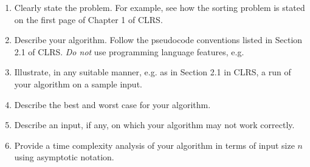 \documentclass[a4paper]{exam}
\begin{document}
\begin{questions}
  \begin{enumerate}
    \renewcommand{\theenumi}{\roman{enumi}} %
    \item Clearly state the problem. For example, see how the sorting problem is stated on the first page of Chapter 1 of CLRS.
    \item Describe your algorithm. Follow the pseudocode conventions listed in Section 2.1 of CLRS. \textit{Do not} use programming language features, e.g. 
    \item Illustrate, in any suitable manner, e.g. as in Section 2.1 in CLRS, a run of your algorithm on a sample input.
    \item Describe the best and worst case for your algorithm.
    \item Describe an input, if any, on which your algorithm may not work correctly.
    \item Provide a time complexity analysis of your algorithm in terms of input size $n$ using asymptotic notation.
    \end{enumerate}

\end{questions}
\end{document}
